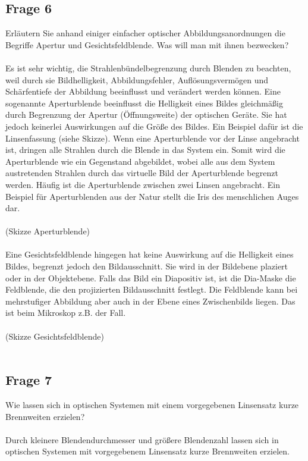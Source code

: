 \documentclass[a4paper,10pt]{scrartcl}
\begin{document}
		\subsection{Frage 6}
			Erläutern Sie anhand einiger einfacher optischer Abbildungsanordnungen die Begriffe Apertur und
			Gesichtsfeldblende. Was will man mit ihnen bezwecken?\\
			\\
			Es ist sehr wichtig, die Strahlenbündelbegrenzung durch Blenden zu beachten, weil durch sie Bildhelligkeit, Abbildungsfehler, Auflösungsvermögen und Schärfentiefe der Abbildung beeinflusst und verändert werden können. Eine sogenannte Aperturblende beeinflusst die Helligkeit eines Bildes gleichmäßig durch Begrenzung der Apertur (Öffnungsweite) der optischen Geräte. Sie hat jedoch keinerlei Auswirkungen auf die Größe des Bildes. Ein Beispiel dafür ist die Linsenfassung (siehe Skizze). Wenn eine Aperturblende vor der Linse angebracht ist, dringen alle Strahlen durch die Blende in das System ein. Somit wird die Aperturblende wie ein Gegenstand abgebildet, wobei alle aus dem System austretenden Strahlen durch das virtuelle Bild der Aperturblende begrenzt werden. Häufig ist die Aperturblende zwischen zwei Linsen angebracht. Ein Beispiel für Aperturblenden aus der Natur stellt die Iris des menschlichen Auges dar.\\
			\\
			(Skizze Aperturblende)\\
			\\
			Eine Gesichtsfeldblende hingegen hat keine Auswirkung auf die Helligkeit eines Bildes, begrenzt jedoch den Bildausschnitt. Sie wird in der Bildebene plaziert oder in der Objektebene. Falls das Bild ein Diapositiv ist, ist die Dia-Maske die Feldblende, die den projizierten Bildausschnitt festlegt. Die Feldblende kann bei mehrstufiger Abbildung aber auch in der Ebene eines Zwischenbilds liegen. Das ist beim Mikroskop z.B. der Fall. \\
			\\
			(Skizze Gesichtsfeldblende)\\
			\\
			
		\subsection{Frage 7}
			Wie lassen sich in optischen Systemen mit einem vorgegebenen Linsensatz kurze Brennweiten
			erzielen?\\
			\\
			Durch kleinere Blendendurchmesser und größere Blendenzahl lassen sich in optischen Systemen mit vorgegebenem Linsensatz kurze Brennweiten erzielen.
			
\end{document}

